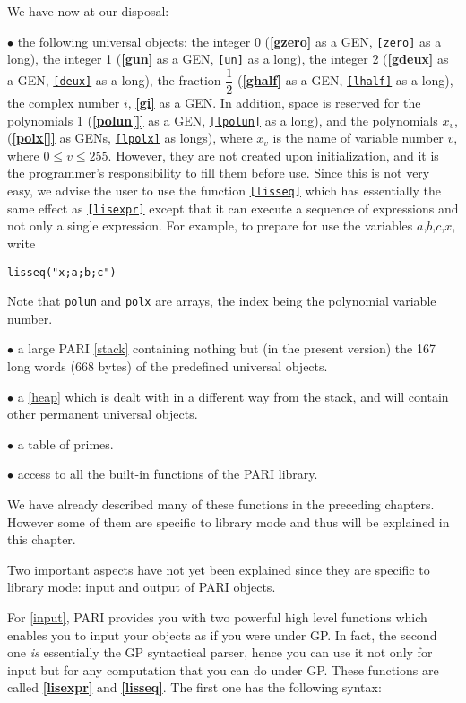 We have now at our disposal:

$\bullet$ the following universal objects: the integer 0 ({\bf \ref{gzero}} as a GEN,
{\tt \ref{zero}} as a long), the integer 1 ({\bf \ref{gun}} as a GEN, {\tt \ref{un}} as a long), the integer 2
({\bf \ref{gdeux}} as a GEN, {\tt \ref{deux}} as a long), the fraction $\dfrac 1 2$ ({\bf \ref{ghalf}} as
a GEN, {\tt \ref{lhalf}} as a long), the complex number $i$, {\bf \ref{gi}} as a GEN. In addition, space is 
reserved for the polynomials 1 ({\bf \ref{polun[]}} as a GEN, {\tt \ref{lpolun}} as a long),
and the polynomials $x_v$, ({\bf \ref{polx[]}} as GENs, {\tt \ref{lpolx}} as longs), where
$x_v$ is the name of variable number $v$, where $0\le v\le 255$. However, 
they are not created upon initialization, and it is the programmer's
responsibility to fill them before use. Since this is not very easy, we
advise the user to use the function {\tt \ref{lisseq}} which has essentially
the same effect as {\tt \ref{lisexpr}} except that it can execute a sequence of
expressions and not only a single expression. For example, to prepare for use
the variables $a$,$b$,$c$,$x$, write 

\centerline{\tt lisseq("x;a;b;c")}

Note that {\tt polun} and {\tt polx} are arrays, the index being the 
polynomial variable number.

$\bullet$ a large PARI \ref{stack} containing nothing but (in the present version)
the 167 long words (668 bytes) of the predefined universal objects.

$\bullet$ a \ref{heap} which is dealt with in a different way from the stack,
and will contain other permanent universal objects.

$\bullet$ a table of primes.

$\bullet$ access to all the built-in functions of the PARI library.

We have already described many of these functions in the preceding chapters.
However some of them are specific to library mode and thus will be explained
in this chapter.


Two important aspects have not yet been explained since they are specific
to library mode: input and output of PARI objects.

For \ref{input}, PARI provides you with two powerful high level functions which enables
you to input your objects as if you were under GP. In fact, the second
one {\sl is \/}
essentially the GP syntactical parser, hence you can use it not only for
input but for any computation that you can do under GP. These functions are
called {\bf \ref{lisexpr}} and {\bf \ref{lisseq}}. The first one has the following syntax:

